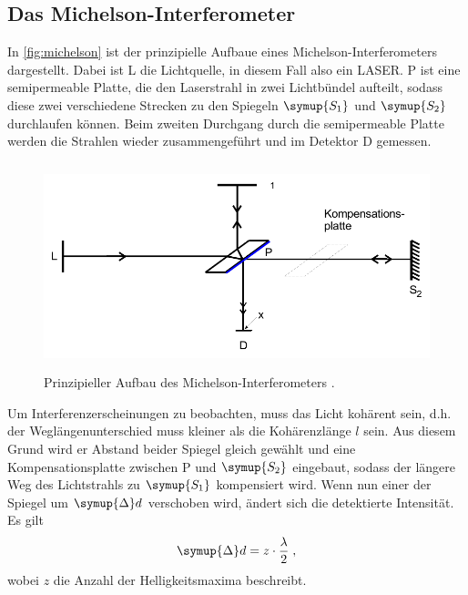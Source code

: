 \subsection{Das Michelson-Interferometer}
In \autoref{fig:michelson} ist der prinzipielle Aufbaue eines Michelson-Interferometers dargestellt. Dabei ist L die Lichtquelle, in diesem Fall
also ein LASER. P ist eine semipermeable Platte, die den Laserstrahl in zwei Lichtbündel aufteilt, sodass diese zwei verschiedene Strecken 
zu den Spiegeln $\symup{S_1}$ und $\symup{S_2}$ durchlaufen können. Beim zweiten Durchgang durch die semipermeable Platte werden die Strahlen 
wieder zusammengeführt und im Detektor D gemessen. 
\begin{figure}
    \centering
    \includegraphics[height = 6cm]{michelson.pdf}
    \caption{Prinzipieller Aufbau des Michelson-Interferometers \cite{ap401}.}
    \label{fig:michelson}
\end{figure}
Um Interferenzerscheinungen zu beobachten, muss das Licht kohärent sein, d.h. der Weglängenunterschied muss kleiner als die Kohärenzlänge $l$ sein. 
Aus diesem Grund wird er Abstand beider Spiegel gleich gewählt und eine Kompensationsplatte zwischen P und $\symup{S_2}$ eingebaut, sodass der längere 
Weg des Lichtstrahls zu $\symup{S_1}$ kompensiert wird. Wenn nun einer der Spiegel um $\symup{\Delta}d$ verschoben wird, ändert sich die detektierte 
Intensität. Es gilt
\begin{equation*}
    \symup{\Delta}d = z \cdot \frac{\lambda}{2} \; ,
\end{equation*}
wobei $z$ die Anzahl der Helligkeitsmaxima beschreibt.

